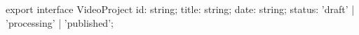 export interface VideoProject {
    id: string;
    title: string;
    date: string;
    status: 'draft' | 'processing' | 'published';
}
